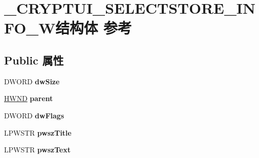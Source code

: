 \hypertarget{struct___c_r_y_p_t_u_i___s_e_l_e_c_t_s_t_o_r_e___i_n_f_o___w}{}\section{\+\_\+\+C\+R\+Y\+P\+T\+U\+I\+\_\+\+S\+E\+L\+E\+C\+T\+S\+T\+O\+R\+E\+\_\+\+I\+N\+F\+O\+\_\+\+W结构体 参考}
\label{struct___c_r_y_p_t_u_i___s_e_l_e_c_t_s_t_o_r_e___i_n_f_o___w}
\subsection*{Public 属性}
\begin{DoxyCompactItemize}
\item 
\mbox{\label{struct___c_r_y_p_t_u_i___s_e_l_e_c_t_s_t_o_r_e___i_n_f_o___w_ae3a36319602aaccb2a2f3276f2ea2ee8}} 
D\+W\+O\+RD {\bfseries dw\+Size}
\item 
\mbox{\label{struct___c_r_y_p_t_u_i___s_e_l_e_c_t_s_t_o_r_e___i_n_f_o___w_a4f1018454f858f586e6734932b0740da}} 
\hyperlink{interfacevoid}{H\+W\+ND} {\bfseries parent}
\item 
\mbox{\label{struct___c_r_y_p_t_u_i___s_e_l_e_c_t_s_t_o_r_e___i_n_f_o___w_ab964d5ecc59e51842cb188082383ffb1}} 
D\+W\+O\+RD {\bfseries dw\+Flags}
\item 
\mbox{\label{struct___c_r_y_p_t_u_i___s_e_l_e_c_t_s_t_o_r_e___i_n_f_o___w_a5a45689ddcbd1658a2ed50064b6f0556}} 
L\+P\+W\+S\+TR {\bfseries pwsz\+Title}
\item 
\mbox{\label{struct___c_r_y_p_t_u_i___s_e_l_e_c_t_s_t_o_r_e___i_n_f_o___w_a0b85e49377ea09d3aae0534317376242}} 
L\+P\+W\+S\+TR {\bfseries pwsz\+Text}
\item 
\mbox{\label{struct___c_r_y_p_t_u_i___s_e_l_e_c_t_s_t_o_r_e___i_n_f_o___w_a0e9927690383b354814b8ce150c33eea}} 

\end{DoxyCompactItemize}
